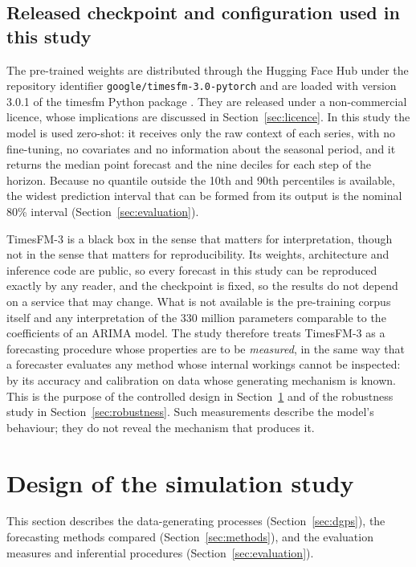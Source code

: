 \documentclass[11pt]{article}
\newcommand{\pkg}[1]{\textsf{#1}}
\newcommand{\proglang}[1]{\textsf{#1}}
\newcommand{\code}[1]{\texttt{#1}}
\providecommand{\sectionref}[1]{Section~\ref{#1}}
\begin{document}
\subsection{Released checkpoint and configuration used in this study}
\label{sec:tfm-config}

The pre-trained weights are distributed through the Hugging Face Hub under the repository
identifier \code{google/\allowbreak timesfm-3.0-pytorch} and are loaded with version 3.0.1 of the
\pkg{timesfm} \proglang{Python} package \citep{timesfm3repo, timesfm3card}. They are released
under a non-commercial licence, whose implications are discussed in \sectionref{sec:licence}. In
this study the model is used zero-shot: it receives only the raw context of each series, with no
fine-tuning, no covariates and no information about the seasonal period, and it returns the
median point forecast and the nine deciles for each step of the horizon. Because no quantile
outside the 10th and 90th percentiles is available, the widest prediction interval that can be
formed from its output is the nominal 80\% interval (\sectionref{sec:evaluation}).

TimesFM-3 is a black box in the sense that matters for interpretation, though not in the sense
that matters for reproducibility. Its weights, architecture and inference code are public, so every
forecast in this study can be reproduced exactly by any reader, and the checkpoint is fixed, so the
results do not depend on a service that may change. What is not available is the pre-training
corpus itself and any interpretation of the 330 million parameters comparable to the coefficients
of an ARIMA model. The study therefore treats TimesFM-3 as a
forecasting procedure whose properties are to be \emph{measured}, in the same way that a
forecaster evaluates any method whose internal workings cannot be inspected: by its accuracy
and calibration on data whose generating mechanism is known. This is the purpose of the
controlled design in \sectionref{sec:design} and of the robustness study in
\sectionref{sec:robustness}. Such measurements describe the model's behaviour; they do not
reveal the mechanism that produces it.

\section{Design of the simulation study}
\label{sec:design}

This section describes the data-generating processes (\sectionref{sec:dgps}), the forecasting
methods compared (\sectionref{sec:methods}), and the evaluation measures and inferential
procedures (\sectionref{sec:evaluation}).
\end{document}
